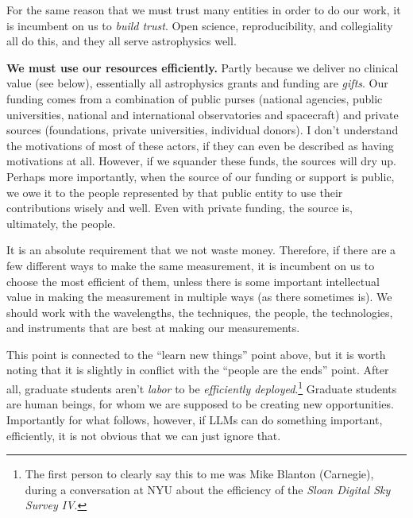 \documentclass{article}
\newcommand{\paragraphskip}{\medskip}
\renewcommand{\paragraph}[1]{\par\paragraphskip\noindent\textbf{#1}}
\begin{document}
For the same reason that we must trust many entities in order to do our work,
it is incumbent on us to \emph{build trust}.
Open science, reproducibility, and collegiality all do this, and they all serve astrophysics well.

\paragraph{We must use our resources efficiently.}
Partly because we deliver no clinical value (see below), essentially all astrophysics grants and funding are \emph{gifts}.
Our funding comes from a combination of public purses (national agencies, public universities, national and international observatories and spacecraft) and private sources (foundations, private universities, individual donors).
I don't understand the motivations of most of these actors, if they can even be described as having motivations at all.
However, if we squander these funds, the sources will dry up.
Perhaps more importantly, when the source of our funding or support is public, we owe it to the people represented by that public entity to use their contributions wisely and well.
Even with private funding, the source is, ultimately, the people.

It is an absolute requirement that we not waste money.
Therefore, if there are a few different ways to make the same measurement, it is incumbent on us to choose the most efficient of them, unless there is some important intellectual value in making the measurement in multiple ways (as there sometimes is).
We should work with the wavelengths, the techniques, the people, the technologies, and instruments that are best at making our measurements.

This point is connected to the ``learn new things'' point above, but it is worth noting that it is slightly in conflict with the ``people are the ends'' point.
After all, graduate students aren't \emph{labor} to be \emph{efficiently deployed}.\footnote{%
The first person to clearly say this to me was Mike Blanton (Carnegie), during a conversation at NYU about the efficiency of the \textit{Sloan Digital Sky Survey IV}.}
Graduate students are human beings, for whom we are supposed to be creating new opportunities.
Importantly for what follows, however, if LLMs can do something important, efficiently, it is not obvious that we can just ignore that.
\end{document}

